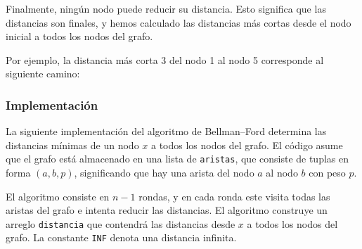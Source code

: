Finalmente, ningún nodo puede reducir su distancia.
Esto significa que las distancias son finales, y hemos
calculado las distancias más cortas desde el nodo inicial
a todos los nodos del grafo.

Por ejemplo, la distancia más corta 3 del nodo 1
al nodo 5 corresponde al siguiente camino:

\begin{center}
\end{center}

\subsubsection{Implementación}

La siguiente implementación del algoritmo de Bellman--Ford
determina las distancias mínimas de un nodo $x$ a todos los
nodos del grafo. El código asume que el grafo está almacenado
en una lista de \texttt{aristas}, que consiste de tuplas
en forma $(a, b, p)$, significando que hay una arista del
nodo $a$ al nodo $b$ con peso $p$.

El algoritmo consiste en $n-1$ rondas, y en cada ronda
este visita todas las aristas del grafo e intenta reducir las
distancias. El algoritmo construye un arreglo \texttt{distancia}
que contendrá las distancias desde $x$ a todos los nodos del grafo.
La constante \texttt{INF} denota una distancia infinita.

